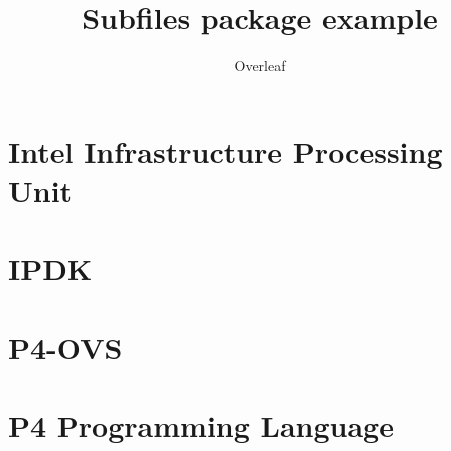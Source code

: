 \documentclass{article}
\title{Subfiles package example}
\author{Overleaf}
\date{ }
\begin{document}
\maketitle

\section{Intel\raisebox {1mm}{\textregistered} Infrastructure Processing Unit}


\section{IPDK}


\section{P4-OVS}


\section{P4 Programming Language}

\end{document}
